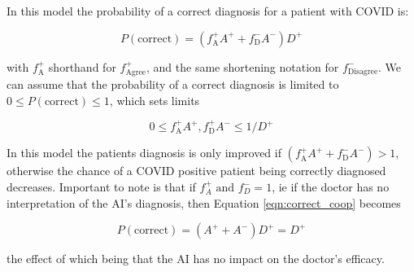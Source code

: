 \documentclass[manuscript,screen,review]{acmart}
\begin{document}
In this model the probability of a correct diagnosis for a patient with COVID is:

\begin{equation}
    P(\textrm{correct}) = (f^+_{\textrm{A}}A^+ + f^-_{\textrm{D}}A^-) D^+
\label{eqn:correct_coop}
\end{equation}

with $f^+_{\textrm{A}}$ shorthand for $f^+_{\textrm{Agree}}$, and the same shortening notation for $f^-_{\textrm{Disagree}}$. We can assume that the probability of a correct diagnosis is limited to $0 \leq P(\textrm{correct}) \leq 1$, which sets limits

\begin{equation}
    0 \leq f^+_{\textrm{A}}A^+, f^+_{\textrm{D}}A^- \leq 1/D^+
\end{equation}


In this model the patients diagnosis is only improved if $(f^+_{\textrm{A}}A^+ + f^-_{\textrm{D}}A^-) > 1$, otherwise the chance of a COVID positive patient being correctly diagnosed decreases. Important to note is that if $f^+_A \textrm{ and } f^-_D = 1$, ie if the doctor has no interpretation of the AI's diagnosis, then Equation \ref{eqn:correct_coop} becomes

\begin{equation}
    P(\textrm{correct}) = (A^+ + A^-) D^+ = D^+
\end{equation}

the effect of which being that the AI has no impact on the doctor's efficacy. 







\end{document}
